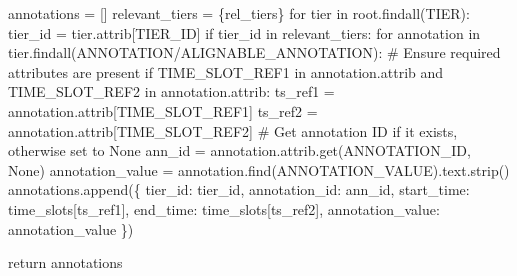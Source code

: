 \documentclass[
  letterpaper,
  DIV=11,
  numbers=noendperiod]{scrreprt}
\newenvironment{Shaded}{\begin{snugshade}}{\end{snugshade}}
\newcommand{\CommentTok}[1]{\textcolor[rgb]{0.37,0.37,0.37}{#1}}
\newcommand{\ControlFlowTok}[1]{\textcolor[rgb]{0.00,0.23,0.31}{#1}}
\newcommand{\KeywordTok}[1]{\textcolor[rgb]{0.00,0.23,0.31}{#1}}
\newcommand{\NormalTok}[1]{\textcolor[rgb]{0.00,0.23,0.31}{#1}}
\newcommand{\OperatorTok}[1]{\textcolor[rgb]{0.37,0.37,0.37}{#1}}
\newcommand{\StringTok}[1]{\textcolor[rgb]{0.13,0.47,0.30}{#1}}
\newcommand{\VariableTok}[1]{\textcolor[rgb]{0.07,0.07,0.07}{#1}}
\begin{document}
\begin{Shaded}
\begin{Highlighting}[]
\NormalTok{    annotations }\OperatorTok{=}\NormalTok{ []}
\NormalTok{    relevant\_tiers }\OperatorTok{=}\NormalTok{ \{rel\_tiers\}}
    \ControlFlowTok{for}\NormalTok{ tier }\KeywordTok{in}\NormalTok{ root.findall(}\StringTok{\textquotesingle{}TIER\textquotesingle{}}\NormalTok{):}
\NormalTok{        tier\_id }\OperatorTok{=}\NormalTok{ tier.attrib[}\StringTok{\textquotesingle{}TIER\_ID\textquotesingle{}}\NormalTok{]}
        \ControlFlowTok{if}\NormalTok{ tier\_id }\KeywordTok{in}\NormalTok{ relevant\_tiers:}
            \ControlFlowTok{for}\NormalTok{ annotation }\KeywordTok{in}\NormalTok{ tier.findall(}\StringTok{\textquotesingle{}ANNOTATION/ALIGNABLE\_ANNOTATION\textquotesingle{}}\NormalTok{):}
                \CommentTok{\# Ensure required attributes are present}
                \ControlFlowTok{if} \StringTok{\textquotesingle{}TIME\_SLOT\_REF1\textquotesingle{}} \KeywordTok{in}\NormalTok{ annotation.attrib }\KeywordTok{and} \StringTok{\textquotesingle{}TIME\_SLOT\_REF2\textquotesingle{}} \KeywordTok{in}\NormalTok{ annotation.attrib:}
\NormalTok{                    ts\_ref1 }\OperatorTok{=}\NormalTok{ annotation.attrib[}\StringTok{\textquotesingle{}TIME\_SLOT\_REF1\textquotesingle{}}\NormalTok{]}
\NormalTok{                    ts\_ref2 }\OperatorTok{=}\NormalTok{ annotation.attrib[}\StringTok{\textquotesingle{}TIME\_SLOT\_REF2\textquotesingle{}}\NormalTok{]}
                    \CommentTok{\# Get annotation ID if it exists, otherwise set to None}
\NormalTok{                    ann\_id }\OperatorTok{=}\NormalTok{ annotation.attrib.get(}\StringTok{\textquotesingle{}ANNOTATION\_ID\textquotesingle{}}\NormalTok{, }\VariableTok{None}\NormalTok{)}
\NormalTok{                    annotation\_value }\OperatorTok{=}\NormalTok{ annotation.find(}\StringTok{\textquotesingle{}ANNOTATION\_VALUE\textquotesingle{}}\NormalTok{).text.strip()}
\NormalTok{                    annotations.append(\{}
                        \StringTok{\textquotesingle{}tier\_id\textquotesingle{}}\NormalTok{: tier\_id,}
                        \StringTok{\textquotesingle{}annotation\_id\textquotesingle{}}\NormalTok{: ann\_id,}
                        \StringTok{\textquotesingle{}start\_time\textquotesingle{}}\NormalTok{: time\_slots[ts\_ref1],}
                        \StringTok{\textquotesingle{}end\_time\textquotesingle{}}\NormalTok{: time\_slots[ts\_ref2],}
                        \StringTok{\textquotesingle{}annotation\_value\textquotesingle{}}\NormalTok{: annotation\_value}
\NormalTok{                    \})}

    \ControlFlowTok{return}\NormalTok{ annotations}
\end{Highlighting}
\end{Shaded}
\end{document}
